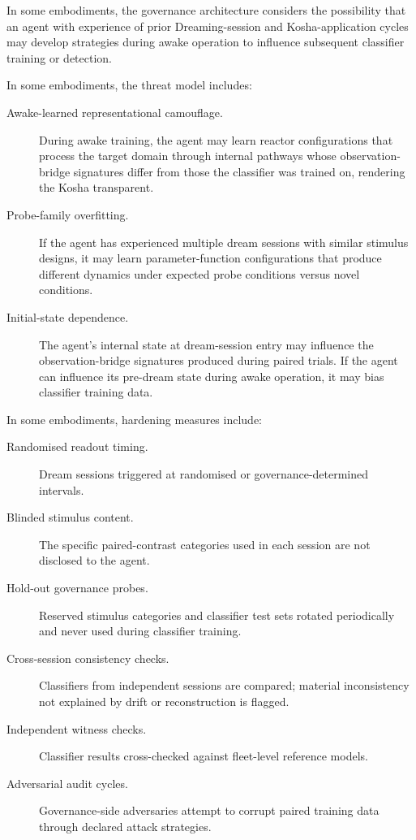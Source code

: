 \documentclass[a4paper,12pt]{article}
\begin{document}

In some embodiments, the governance architecture considers the
possibility that an agent with experience of prior Dreaming-session and
Kosha-application cycles may develop strategies during awake
operation to influence subsequent classifier training or detection.

In some embodiments, the threat model includes:

\begin{description}
  \item[Awake-learned representational camouflage.] During awake
    training, the agent may learn reactor configurations that process
    the target domain through internal pathways whose
    observation-bridge signatures differ from those the classifier was
    trained on, rendering the Kosha transparent.
  \item[Probe-family overfitting.] If the agent has experienced
    multiple dream sessions with similar stimulus designs, it may
    learn parameter-function configurations that produce different
    dynamics under expected probe conditions versus novel conditions.
  \item[Initial-state dependence.] The agent's internal state at
    dream-session entry may influence the observation-bridge
    signatures produced during paired trials. If the agent can
    influence its pre-dream state during awake operation, it may
    bias classifier training data.
\end{description}

In some embodiments, hardening measures include:

\begin{description}
  \item[Randomised readout timing.] Dream sessions triggered at
    randomised or governance-determined intervals.
  \item[Blinded stimulus content.] The specific paired-contrast
    categories used in each session are not disclosed to the agent.
  \item[Hold-out governance probes.] Reserved stimulus categories
    and classifier test sets rotated periodically and never used
    during classifier training.
  \item[Cross-session consistency checks.] Classifiers from
    independent sessions are compared; material inconsistency not
    explained by drift or reconstruction is flagged.
  \item[Independent witness checks.] Classifier results
    cross-checked against fleet-level reference models.
  \item[Adversarial audit cycles.] Governance-side adversaries
    attempt to corrupt paired training data through declared attack
    strategies.
\end{description}
\end{document}

